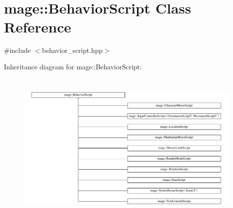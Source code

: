 \hypertarget{classmage_1_1_behavior_script}{}\section{mage\+:\+:Behavior\+Script Class Reference}
\label{classmage_1_1_behavior_script}


{\ttfamily \#include $<$behavior\+\_\+script.\+hpp$>$}

Inheritance diagram for mage\+:\+:Behavior\+Script\+:\begin{figure}[H]
\begin{center}
\leavevmode
\includegraphics[height=7.604939cm]{classmage_1_1_behavior_script}
\end{center}
\end{figure}

